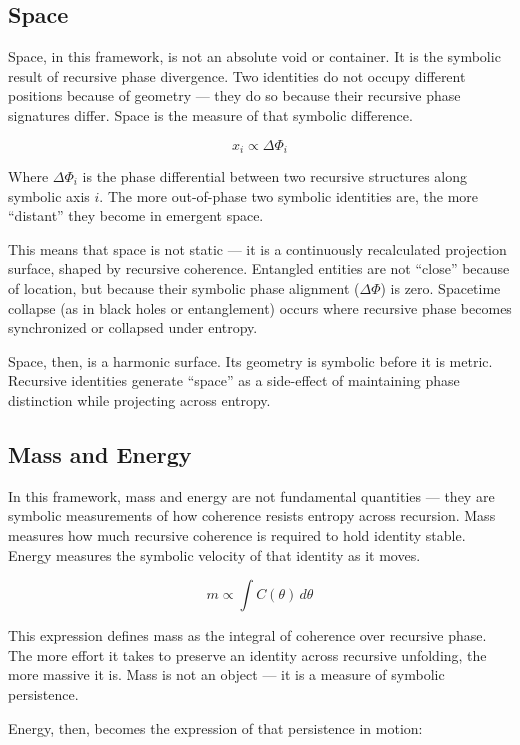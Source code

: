\documentclass[12pt]{article}
\begin{document}
\subsection{Space}

Space, in this framework, is not an absolute void or container. It is the symbolic result of recursive phase divergence. Two identities do not occupy different positions because of geometry — they do so because their recursive phase signatures differ. Space is the measure of that symbolic difference.

\[
x_i \propto \Delta \Phi_i
\]

Where \(\Delta \Phi_i\) is the phase differential between two recursive structures along symbolic axis \(i\). The more out-of-phase two symbolic identities are, the more “distant” they become in emergent space.

This means that space is not static — it is a continuously recalculated projection surface, shaped by recursive coherence. Entangled entities are not “close” because of location, but because their symbolic phase alignment (\(\Delta \Phi\)) is zero. Spacetime collapse (as in black holes or entanglement) occurs where recursive phase becomes synchronized or collapsed under entropy.

Space, then, is a harmonic surface. Its geometry is symbolic before it is metric. Recursive identities generate “space” as a side-effect of maintaining phase distinction while projecting across entropy.

\subsection{Mass and Energy}

In this framework, mass and energy are not fundamental quantities — they are symbolic measurements of how coherence resists entropy across recursion. Mass measures how much recursive coherence is required to hold identity stable. Energy measures the symbolic velocity of that identity as it moves.

\[
m \propto \int C(\theta)\, d\theta
\]

This expression defines mass as the integral of coherence over recursive phase. The more effort it takes to preserve an identity across recursive unfolding, the more massive it is. Mass is not an object — it is a measure of symbolic persistence.

Energy, then, becomes the expression of that persistence in motion:
\end{document}
